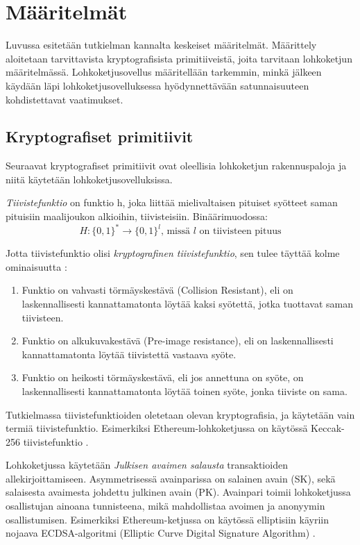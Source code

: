 \chapter{Määritelmät \label{methods}}

Luvussa esitetään tutkielman kannalta keskeiset määritelmät. Määrittely aloitetaan tarvittavista kryptografisista primitiiveistä, joita tarvitaan lohkoketjun määritelmässä. Lohkoketjusovellus määritellään tarkemmin, minkä jälkeen käydään läpi lohkoketjusovelluksessa hyödynnettävään satunnaisuuteen kohdistettavat vaatimukset.

\section{Kryptografiset primitiivit}

Seuraavat kryptografiset primitiivit ovat oleellisia lohkoketjun rakennuspaloja ja niitä käytetään lohkoketjusovelluksissa.

\textit{Tiivistefunktio} on funktio h, joka liittää mielivaltaisen pituiset syötteet saman pituisiin maalijoukon alkioihin, tiivisteisiin. Binäärimuodossa: 
\begin{equation}
    H : \{0, 1\}^* \longrightarrow  \{0, 1\}^l \text{, missä $l$ on tiivisteen pituus}
\end{equation}

Jotta tiivistefunktio olisi \textit{kryptografinen tiivistefunktio}, sen tulee täyttää kolme ominaisuutta \cite{cryptoeprint:2011:565}: 

\begin{enumerate}
    \item Funktio on vahvasti törmäyskestävä (Collision Resistant), eli on laskennallisesti kannattamatonta löytää kaksi syötettä, jotka tuottavat saman tiivisteen.
    \item Funktio on alkukuvakestävä (Pre-image resistance), eli on laskennallisesti kannattamatonta löytää tiivistettä vastaava syöte.
    \item Funktio on heikosti törmäyskestävä, eli jos annettuna on syöte, on laskennallisesti kannattamatonta löytää toinen syöte, jonka tiiviste on sama.
\end{enumerate}

Tutkielmassa tiivistefunktioiden oletetaan olevan kryptografisia, ja käytetään vain termiä tiivistefunktio. Esimerkiksi Ethereum-lohkoketjussa on käytössä Keccak-256 tiivistefunktio \cite{wood2014ethereum}. 

Lohkoketjussa käytetään \textit{Julkisen avaimen salausta} transaktioiden allekirjoittamiseen. Asymmetrisessä avainparissa on salainen avain (SK), sekä salaisesta avaimesta johdettu julkinen avain (PK). Avainpari toimii lohkoketjussa osallistujan ainoana tunnisteena, mikä mahdollistaa avoimen ja anonyymin osallistumisen. Esimerkiksi Ethereum-ketjussa on käytössä elliptisiin käyriin nojaava ECDSA-algoritmi (Elliptic Curve Digital Signature Algorithm) \cite{wood2014ethereum}. 

